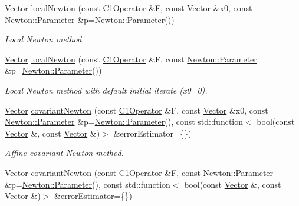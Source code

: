 \begin{DoxyCompactItemize}
\item 
\hyperlink{classSpacy_1_1Vector}{\-Vector} \hyperlink{group__NewtonGroup_ga448b8e78b2e84ed78e70c42114ea7599}{local\-Newton} (const \hyperlink{classSpacy_1_1C1Operator}{\-C1\-Operator} \&\-F, const \hyperlink{classSpacy_1_1Vector}{\-Vector} \&x0, const \hyperlink{structSpacy_1_1Newton_1_1Parameter}{\-Newton\-::\-Parameter} \&p=\hyperlink{structSpacy_1_1Newton_1_1Parameter}{\-Newton\-::\-Parameter}())
\begin{DoxyCompactList}\small\item\em \-Local \-Newton method. \end{DoxyCompactList}\item 
\hyperlink{classSpacy_1_1Vector}{\-Vector} \hyperlink{group__NewtonGroup_gafbe5e25f46f7b0d237f5e9971cef998a}{local\-Newton} (const \hyperlink{classSpacy_1_1C1Operator}{\-C1\-Operator} \&\-F, const \hyperlink{structSpacy_1_1Newton_1_1Parameter}{\-Newton\-::\-Parameter} \&p=\hyperlink{structSpacy_1_1Newton_1_1Parameter}{\-Newton\-::\-Parameter}())
\begin{DoxyCompactList}\small\item\em \-Local \-Newton method with default initial iterate (x0=0). \end{DoxyCompactList}\item 
\hyperlink{classSpacy_1_1Vector}{\-Vector} \hyperlink{group__NewtonGroup_ga6c18ad252cb530e4f6734eb4e4fda481}{covariant\-Newton} (const \hyperlink{classSpacy_1_1C1Operator}{\-C1\-Operator} \&\-F, const \hyperlink{classSpacy_1_1Vector}{\-Vector} \&x0, const \hyperlink{structSpacy_1_1Newton_1_1Parameter}{\-Newton\-::\-Parameter} \&p=\hyperlink{structSpacy_1_1Newton_1_1Parameter}{\-Newton\-::\-Parameter}(), const std\-::function$<$ bool(const \hyperlink{classSpacy_1_1Vector}{\-Vector} \&, const \hyperlink{classSpacy_1_1Vector}{\-Vector} \&)$>$ \&error\-Estimator=\{\})
\begin{DoxyCompactList}\small\item\em \-Affine covariant \-Newton method. \end{DoxyCompactList}\item 
\hyperlink{classSpacy_1_1Vector}{\-Vector} \hyperlink{group__NewtonGroup_ga2d469322482680319bf81d865ed57068}{covariant\-Newton} (const \hyperlink{classSpacy_1_1C1Operator}{\-C1\-Operator} \&\-F, const \hyperlink{structSpacy_1_1Newton_1_1Parameter}{\-Newton\-::\-Parameter} \&p=\hyperlink{structSpacy_1_1Newton_1_1Parameter}{\-Newton\-::\-Parameter}(), const std\-::function$<$ bool(const \hyperlink{classSpacy_1_1Vector}{\-Vector} \&, const \hyperlink{classSpacy_1_1Vector}{\-Vector} \&)$>$ \&error\-Estimator=\{\})

\end{DoxyCompactItemize}
